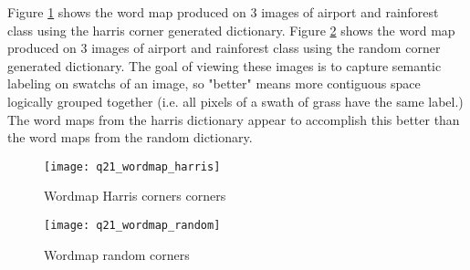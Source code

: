 \documentclass[12pt]{article}
\begin{document}
Figure \ref{fig:wordmapharris} shows the word map produced on 3 images of airport and rainforest class using the harris corner generated dictionary.
Figure \ref{fig:wordmaprandom} shows the word map produced on 3 images of airport and rainforest class using the random corner generated dictionary.
The goal of viewing these images is to capture semantic labeling on swatchs of an image, so "better" means more contiguous space logically grouped together (i.e. all pixels of a swath of grass have the same label.) The word maps from the harris dictionary appear to accomplish this better than the word maps from the random dictionary.

\begin{figure}[H]
\centering
\texttt{[image: q21\_wordmap\_harris]}
\caption{Wordmap Harris corners corners}    
\label{fig:wordmapharris}
\end{figure}   


\begin{figure}[H]
\centering
\texttt{[image: q21\_wordmap\_random]}
\caption{Wordmap random corners}    
\label{fig:wordmaprandom}
\end{figure}   
\end{document}
